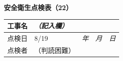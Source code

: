 \documentclass[UTF8,10pt,a4paper,fontset=fandol]{ctexart}
\newcommand{\fieldvalue}[1]{#1}
\newcommand{\handwritten}[1]{#1}
\begin{document}
\vspace{1em}


\newpage

\begin{center}
\textbf{安全衛生点検表（22）}
\end{center}

\noindent
\begin{tabularx}{\textwidth}{|l|X|l|}
\hline
工事名 & \multicolumn{2}{l|}{\textit{（記入欄）}}\\
\hline
点検日 &
\fieldvalue{\handwritten{8/19}} &
\multicolumn{1}{l|}{\textit{年　月　日}}\\
\hline
点検者 &
\fieldvalue{\handwritten{（判読困難）}} &
\\
\hline
\end{tabularx}

\vspace{0.5em}
\end{document}
